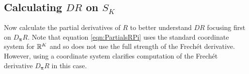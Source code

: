 \subsection{Calculating \( DR \) on \( S_K \) }

%
%



Now calculate the partial derivatives of $R$ to better understand $DR$ focusing first on \( D_{\bm\pi}R \).  Note that equation \eqref{eqn:PartialsRPi} uses the standard coordinate system for \( \mathbb R^{K} \) and so does not use the full strength of the Frech\'et derivative.  However, using a coordinate system clarifies computation of the Frech\'et derivative \( D_{\bm\pi}R \) in this case.

